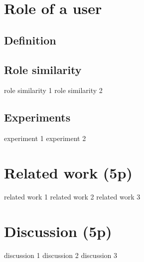 \documentclass[a4paper,12pt]{report}
\begin{document}
\chapter{Role of a user}

\section{Definition}
\newpage
\section{Role similarity}
role similarity 1 \newpage
role similarity 2 \newpage
\section{Experiments}
experiment 1 \newpage
experiment 2 \newpage

\chapter{Related work (5p)}
related work 1 \newpage
related work 2 \newpage
related work 3 \newpage

\chapter{Discussion (5p) }
discussion 1 \newpage
discussion 2 \newpage
discussion 3 \newpage
\end{document}
